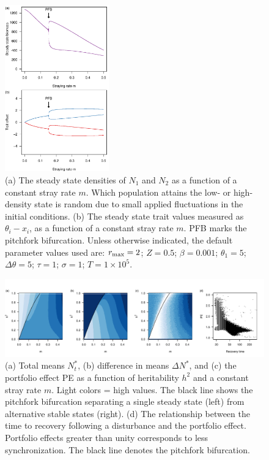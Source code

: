 \documentclass{revtex4}
\begin{document}
\begin{figure}
  \captionsetup{justification=raggedright,
singlelinecheck=false
}
\centering
\includegraphics[width=0.4\textwidth]{fig_traj.pdf}
\caption{
(a) The steady state densities of $N_1$ and $N_2$ as a function of a constant stray rate $m$. Which population attains the low- or high-density state is random due to small applied fluctuations in the initial conditions.
(b) The steady state trait values measured as $\theta_i - x_i$, as a function of a constant stray rate $m$. 
PFB marks the pitchfork bifurcation.
Unless otherwise indicated, the default parameter values used are: $r_{\rm max}=2$; $Z=0.5$; $\beta=0.001$; $\theta_1=5$; $\Delta\theta=5$; $\tau=1$; $\sigma=1$; $T=1\times10^5$.
} \label{fig:traj}
\end{figure}

\begin{figure}
  \captionsetup{justification=raggedright,
singlelinecheck=false
}
\centering
\includegraphics[width=1\textwidth]{fig_MDPE_hm.pdf}
\caption{
(a) Total means $N_t^*$, 
(b) difference in means $\Delta N^*$, and 
(c) the portfolio effect PE as a function of heritability $h^2$ and a constant stray rate $m$. Light colors = high values.
The black line shows the pitchfork bifurcation separating a single steady state (left) from alternative stable states (right).
(d) The relationship between the time to recovery following a disturbance and the portfolio effect. Portfolio effects greater than unity corresponds to less synchronization.
The black line denotes the pitchfork bifurcation.
} \label{fig:PE}
\end{figure}
\end{document}
